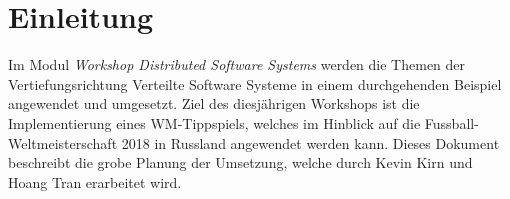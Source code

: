 \chapter{Einleitung}
\vspace{0.5cm}

Im Modul \textit{Workshop Distributed Software Systems} werden die Themen der Vertiefungsrichtung Verteilte Software Systeme in einem durchgehenden Beispiel angewendet und umgesetzt. Ziel des diesjährigen Workshops ist die Implementierung eines WM-Tippspiels, welches im Hinblick auf die Fussball-Weltmeisterschaft 2018 in Russland angewendet werden kann. Dieses Dokument beschreibt die grobe Planung der Umsetzung, welche durch Kevin Kirn und Hoang Tran erarbeitet wird.